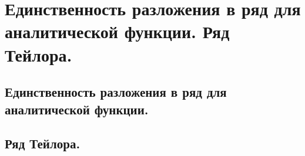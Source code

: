 \section{Единственность разложения в ряд для аналитической функции. Ряд Тейлора.}

\subsection{Единственность разложения в ряд для аналитической функции.}

\subsection{Ряд Тейлора.}